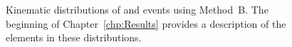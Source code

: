 \begin{figure}[h!]
\caption{Kinematic distributions of \phoonejet and \photwojet events using \mbox{Method B}. The beginning of Chapter~\ref{chp:Results} provides a description of the elements in these distributions.}
\label{fig:pjMtdBSetTwo}
\end{figure}
\clearpage

